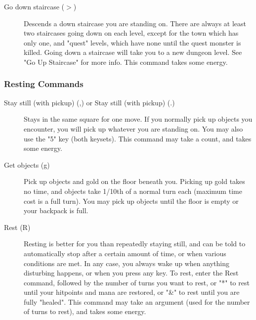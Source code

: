 \begin{description}
\item[Go down staircase ($>$)] Descends a down staircase you are
  standing on. There are always at least two staircases going down
  on each level, except for the town which has only one, and
  "quest" levels, which have none until the quest monster is
  killed. Going down a staircase will take you to a new dungeon
  level. See "Go Up Staircase" for more info.  This command takes
  some energy.
\end{description}

\subsubsection{Resting Commands}
\begin{description}
\item[Stay still (with pickup) (,) or Stay still (with pickup) (.)]
  Stays in the
  same square for one move. If you normally pick up objects you
  encounter, you will pick up whatever you are standing on. You
  may also use the "5" key (both keysets). This command may take a
  count, and takes some energy.
  
\item[Get objects (g)] Pick up objects and gold on the floor beneath
  you. Picking up gold takes no time, and objects take 1/10th of a
  normal turn each (maximum time cost is a full turn). You may
  pick up objects until the floor is empty or your backpack is
  full.
  
\item[Rest (R)] Resting is better for you than repeatedly staying
  still, and can be told to automatically stop after a certain
  amount of time, or when various conditions are met. In any case,
  you always wake up when anything disturbing happens, or when you
  press any key. To rest, enter the Rest command, followed by the
  number of turns you want to rest, or "*" to rest until your
  hitpoints and mana are restored, or "\&" to rest until you are
  fully "healed". This command may take an argument (used for the
  number of turns to rest), and takes some energy.
\end{description}

